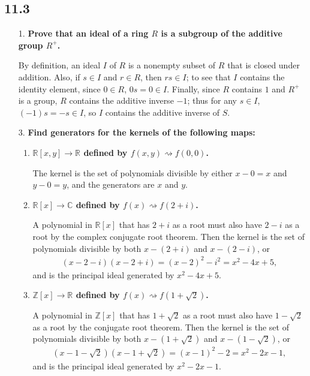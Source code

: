 \documentclass[a4paper,12pt]{article}
\begin{document}
\subsection*{11.3}
\begin{enumerate}
    \item[1.]
        \boldmath
        \textbf{Prove that an ideal of a ring $R$ is a subgroup of the additive group $R^+$.} \par
        \unboldmath
        By definition, an ideal $I$ of $R$ is a nonempty subset of $R$ that is closed under addition. Also, if $s \in I$ and $r \in R$, then $rs \in I$; to see that $I$ contains the identity element, since $0 \in R$, $0s = 0 \in I$. Finally, since $R$ contains $1$ and $R^+$ is a group, $R$ contains the additive inverse $-1$; thus for any $s \in I$, $(-1)s = -s \in I$, so $I$ contains the additive inverse of $S$.

    \item[3.]
        \boldmath
        \textbf{Find generators for the kernels of the following maps:}
        \unboldmath
        \begin{enumerate}
            \item
                \boldmath
                \textbf{$\mathbb{R}[x, y] \to \mathbb{R}$ defined by $f(x, y) \rightsquigarrow f(0, 0)$.} \par
                \unboldmath
                The kernel is the set of polynomials divisible by either $x - 0 = x$ and $y - 0 = y$, and the generators are $x$ and $y$.

            \item
                \boldmath
                \textbf{$\mathbb{R}[x] \to \mathbb{C}$ defined by $f(x) \rightsquigarrow f(2 + i)$.} \par
                \unboldmath
                A polynomial in $\mathbb{R}[x]$ that has $2 + i$ as a root must also have $2 - i$ as a root by the complex conjugate root theorem. Then the kernel is the set of polynomials divisible by both $x - (2 + i)$ and $x - (2 - i)$, or
                \begin{align*}
                    (x - 2 - i)(x - 2 + i) = (x - 2)^2 - i^2 = x^2 - 4x + 5,
                \end{align*}
                and is the principal ideal generated by $x^2 - 4x + 5$.

            \item
                \boldmath
                \textbf{$\mathbb{Z}[x] \to \mathbb{R}$ defined by $f(x) \rightsquigarrow f(1 + \sqrt{2})$.} \par
                \unboldmath
                A polynomial in $\mathbb{Z}[x]$ that has $1 + \sqrt{2}$ as a root must also have $1 - \sqrt{2}$ as a root by the conjugate root theorem. Then the kernel is the set of polynomials divisible by both $x - (1 + \sqrt{2})$ and $x - (1 - \sqrt{2})$, or
                \begin{align*}
                    (x - 1 - \sqrt{2})(x - 1 + \sqrt{2}) = (x - 1)^2 - 2 = x^2 - 2x - 1,
                \end{align*}
                and is the principal ideal generated by $x^2 - 2x - 1$.


\end{enumerate}
\end{enumerate}
\end{document}
